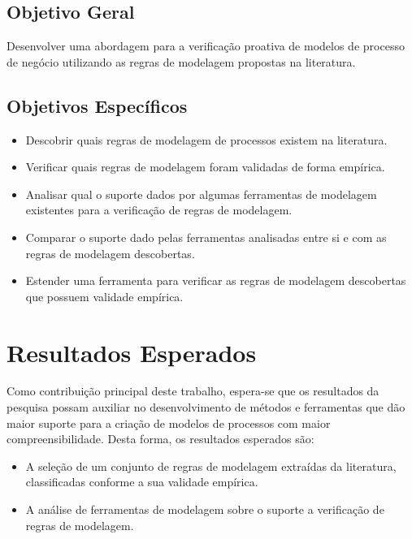 \documentclass[12pt]{article}
\begin{document}
\subsection{Objetivo Geral}

Desenvolver uma abordagem para a verificação proativa de modelos de processo de negócio utilizando as regras de modelagem propostas na literatura.

\subsection{Objetivos Específicos}
\begin{itemize}
	\item Descobrir quais regras de modelagem de processos existem na literatura.
	\item Verificar quais regras de modelagem foram validadas de forma empírica.
	\item Analisar qual o suporte dados por algumas ferramentas de modelagem existentes para a verificação de regras de modelagem.
	\item Comparar o suporte dado pelas ferramentas analisadas entre si e com as regras de modelagem descobertas.
	\item Estender uma ferramenta para verificar as regras de modelagem descobertas que possuem validade empírica.
\end{itemize}

\newpage
\section{Resultados Esperados}

Como contribuição principal deste trabalho, espera-se que os resultados da pesquisa possam auxiliar no desenvolvimento de métodos e ferramentas que dão maior suporte para a criação de modelos de processos com maior compreensibilidade. Desta forma, os resultados esperados são:

\begin{itemize}
	\item A seleção de um conjunto de regras de modelagem extraídas da literatura, classificadas conforme a sua validade empírica.
	\item A análise de ferramentas de modelagem sobre o suporte a verificação de regras de modelagem.
\end{itemize}
\end{document}
